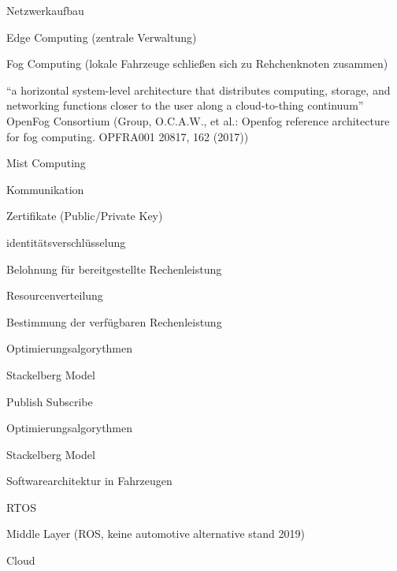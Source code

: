 \begin{notes}
    \item Netzwerkaufbau
    \begin{notes}
        \item Edge Computing (zentrale Verwaltung)
        \item Fog Computing (lokale Fahrzeuge schließen sich zu Rehchenknoten zusammen)
        \item “a horizontal system-level architecture that distributes computing, storage, and networking functions closer to the user along a cloud-to-thing continuum”  OpenFog Consortium (Group, O.C.A.W., et al.: Openfog reference architecture for fog computing. OPFRA001 20817, 162 (2017))
        \item Mist Computing
    \end{notes}
    \item Kommunikation
    \begin{notes}
        \item Zertifikate (Public/Private Key)
        \item identitätsverschlüsselung
        \item Belohnung für bereitgestellte Rechenleistung
    \end{notes}
    \item Resourcenverteilung
    \begin{notes}
        \item Bestimmung der verfügbaren Rechenleistung 
        \item Optimierungsalgorythmen
        \item Stackelberg Model
    \end{notes}
    \item Publish Subscribe
    \begin{notes}
        \item 
        \item Optimierungsalgorythmen
        \item Stackelberg Model
    \end{notes}
    \item Softwarearchitektur in Fahrzeugen
   \begin{notes}
        \item RTOS
        \item Middle Layer (ROS, keine automotive alternative stand 2019)
        \item Cloud
    \end{notes}
\end{notes}

